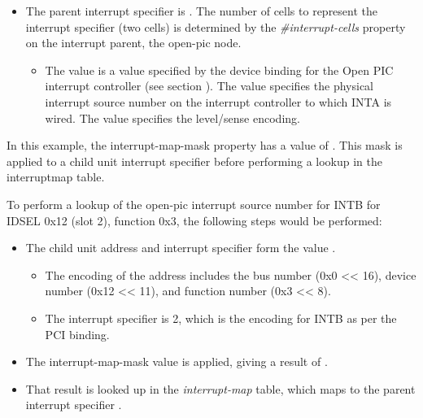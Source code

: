 \documentclass[a4paper,10pt,oneside]{sphinxmanual}
\begin{document}
\begin{itemize}
\begin{itemize}
\item {} 
The parent interrupt specifier is . The number of cells to
represent the interrupt specifier (two cells) is determined by the
\emph{\#interrupt-cells} property on the interrupt parent, the open-pic
node.
\begin{itemize}
\item {} 
The value  is a value specified by the device binding for
the Open PIC interrupt controller (see section
{\hyperref[device\string-bindings:sect\string-bindings\string-simple\string-bus]{}}). The value \code{\textless{}2\textgreater{}} specifies the
physical interrupt source number on the interrupt controller to
which INTA is wired. The value \code{\textless{}1\textgreater{}} specifies the level/sense
encoding.

\end{itemize}

\end{itemize}

\end{itemize}

In this example, the interrupt-map-mask property has a value of . This mask is applied to a child unit interrupt specifier before
performing a lookup in the interruptmap table.

To perform a lookup of the open-pic interrupt source number for INTB for
IDSEL 0x12 (slot 2), function 0x3, the following steps would be
performed:
\begin{itemize}
\item {} 
The child unit address and interrupt specifier form the value
.
\begin{itemize}
\item {} 
The encoding of the address includes the bus number (0x0 \textless{}\textless{} 16),
device number (0x12 \textless{}\textless{} 11), and function number (0x3 \textless{}\textless{} 8).

\item {} 
The interrupt specifier is 2, which is the encoding for INTB as
per the PCI binding.

\end{itemize}

\item {} 
The interrupt-map-mask value  is applied, giving a
result of .

\item {} 
That result is looked up in the \emph{interrupt-map} table, which maps to
the parent interrupt specifier .

\end{itemize}
\end{document}
